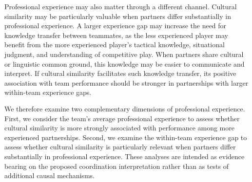 \documentclass[10pt]{article}
\begin{document}
Professional experience may also matter through a different channel. Cultural similarity may be particularly valuable when partners differ substantially in professional experience. A larger experience gap may increase the need for knowledge transfer between teammates, as the less experienced player may benefit from the more experienced player's tactical knowledge, situational judgment, and understanding of competitive play. When partners share cultural or linguistic common ground, this knowledge may be easier to communicate and interpret. If cultural similarity facilitates such knowledge transfer, its positive association with team performance should be stronger in partnerships with larger within-team experience gaps.

We therefore examine two complementary dimensions of professional experience. First, we consider the team’s average professional experience to assess whether cultural similarity is more strongly associated with performance among more experienced partnerships. Second, we examine the within-team experience gap to assess whether cultural similarity is particularly relevant when partners differ substantially in professional experience. These analyses are intended as evidence bearing on the proposed coordination interpretation rather than as tests of additional causal mechanisms.



\end{document}
